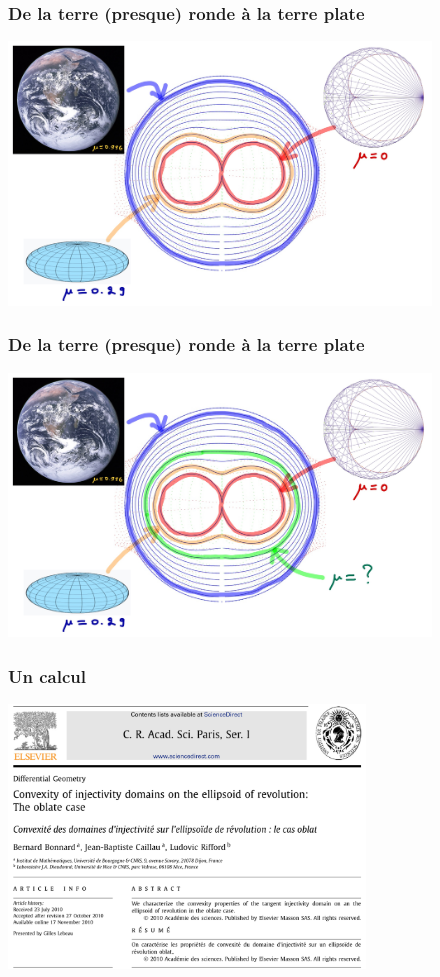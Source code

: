 \documentclass[9pt]{beamer}
\begin{document}
\begin{frame}
\frametitle{\bf De la terre (presque) ronde \`a la terre plate}
 
\centering \includegraphics[height=7.0cm]{oblat3}

\end{frame}

\begin{frame}
\frametitle{\bf De la terre (presque) ronde \`a la terre plate}
 
\centering \includegraphics[height=7.0cm]{oblat4}

\end{frame}

\begin{frame}
\frametitle{\bf Un calcul}
 
\centering \includegraphics[height=7.0cm]{cras1}

\end{frame}
\end{document}
